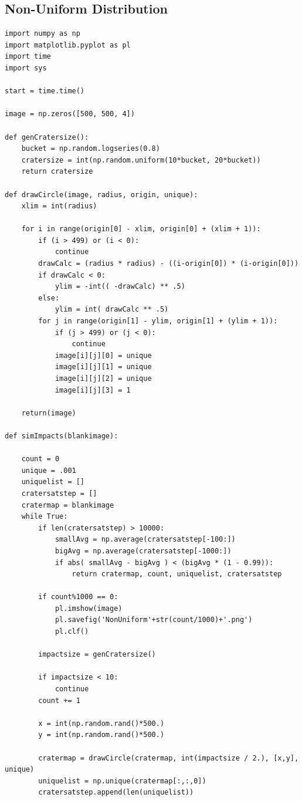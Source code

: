 \documentclass[11pt]{article}
\begin{document}
\subsection{Non-Uniform Distribution}
\begin{verbatim}
import numpy as np
import matplotlib.pyplot as pl
import time
import sys

start = time.time()

image = np.zeros([500, 500, 4])

def genCratersize():
    bucket = np.random.logseries(0.8)
    cratersize = int(np.random.uniform(10*bucket, 20*bucket))
    return cratersize

def drawCircle(image, radius, origin, unique):
    xlim = int(radius)

    for i in range(origin[0] - xlim, origin[0] + (xlim + 1)):
        if (i > 499) or (i < 0):
            continue
        drawCalc = (radius * radius) - ((i-origin[0]) * (i-origin[0]))
        if drawCalc < 0:
            ylim = -int(( -drawCalc) ** .5)
        else:
            ylim = int( drawCalc ** .5)
        for j in range(origin[1] - ylim, origin[1] + (ylim + 1)):
            if (j > 499) or (j < 0):
                continue
            image[i][j][0] = unique
            image[i][j][1] = unique
            image[i][j][2] = unique
            image[i][j][3] = 1

    return(image)

def simImpacts(blankimage):

    count = 0
    unique = .001
    uniquelist = []
    cratersatstep = []
    cratermap = blankimage
    while True:
        if len(cratersatstep) > 10000:
            smallAvg = np.average(cratersatstep[-100:])
            bigAvg = np.average(cratersatstep[-1000:])
            if abs( smallAvg - bigAvg ) < (bigAvg * (1 - 0.99)):
                return cratermap, count, uniquelist, cratersatstep

        if count%1000 == 0:
            pl.imshow(image)
            pl.savefig('NonUniform'+str(count/1000)+'.png')
            pl.clf()

        impactsize = genCratersize()

        if impactsize < 10:
            continue
        count += 1

        x = int(np.random.rand()*500.)
        y = int(np.random.rand()*500.)

        cratermap = drawCircle(cratermap, int(impactsize / 2.), [x,y], unique)
        uniquelist = np.unique(cratermap[:,:,0])
        cratersatstep.append(len(uniquelist))


\end{verbatim}
\end{document}
